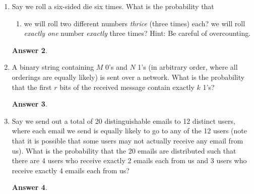 \documentclass[12pt]{article}
\renewcommand{\(}{\left(}
\renewcommand{\)}{\right)}
\theoremstyle{definition}
\newtheorem*{answer}{Answer}
\begin{document}
\begin{enumerate}
\begin{enumerate}[label=\alph*.]
    \end{enumerate}

    \begin{shaded}
    \begin{answer}

    \end{answer}
    \end{shaded}
    \newpage


\item Say we roll a six-sided die six times. What is the probability that
    \begin{enumerate}[label=\alph*.]
    \item we will roll two different numbers \textit{thrice} (three times) each?
    we will roll \textit{exactly one} number \textit{exactly} three times? Hint: Be careful of overcounting.
    \end{enumerate}

    \begin{shaded}
    \begin{answer}

    \end{answer}
    \end{shaded}
    \newpage


\item A binary string containing $M$  0's and $N$  1's (in arbitrary order, where all orderings are equally likely) is sent over a network.  What is the probability that the first $r$ bits of the received message contain exactly $k$  1's?

    \begin{shaded}
    \begin{answer}

    \end{answer}
    \end{shaded}
    \newpage


\item Say we send out a total of 20 distinguishable emails to 12 distinct users, where each email we send is equally likely to go to any of the 12 users (note that it is possible that some users may not actually receive any email from us).  What is the probability that the 20 emails are distributed such that there are 4 users who receive exactly 2 emails each from us and 3 users who receive exactly 4 emails each from us?

    \begin{shaded}
    \begin{answer}


\end{answer}
\end{shaded}
\end{enumerate}
\end{document}
